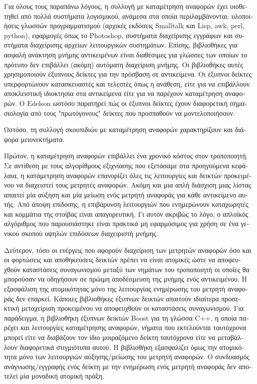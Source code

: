 \begin{greek}
Για όλους τους παραπάνω λόγους, η συλλογή με καταμέτρηση
αναφορών έχει υιοθετηθεί από πολλά συστήματα λογισμικού,
ανάμεσα στα οποία περιλαμβάνονται: υλοποιήσεις γλωσσών
προγραμματισμού (αρχικές εκδόσεις Smalltalk και Lisp, awk,
perl, python), εφαρμογές όπως το Photoshop, συστήματα
διαχείρισης εγγράφων και συστήματα διαχείρισης αρχείων
λειτουργικών συστημάτων. Επίσης, βιβλιοθήκες για ασφαλή
ανάκτηση μνήμης αντικειμένων είναι διαθέσιμες για γλώσσες
των οποίων το πρότυπο δεν επιβάλλει (ακόμη) αυτόματη
διαχείριση μνήμης. Οι βιβλιοθήκες αυτές χρησιμοποιούν
έξυπνους δείκτες για την πρόσβαση σε αντικείμενα. Οι
έξυπνοι δείκτες υπερφορτώνουν κατασκευαστές και τελεστές
όπως η ανάθεση, είτε για να επιβάλλουν αποκλειστική ιδιοκτησία
στα αντικείμενα είτε για να παρέχουν καταμέτρηση αναφορών.
Ο Edelson \cite{DBLP:conf/iwmm/Edelson92} ωστόσο παρατηρεί
πώς οι έξυπνοι δείκτες έχουν διαφορετική σημασιολογία από
τους "πρωτόγονους" δείκτες που προσπαθούν να μοντελοποιήσουν.

Ωστόσο, τη συλλογή σκουπιδιών με καταμέτρηση αναφορών
χαρακτηρίζουν και διάφορα μειονεκτήματα.

Πρώτον, η καταμέτρηση αναφορών επιβάλλει ένα χρονικό κόστος
στον τροποποιητή. Σε αντίθεση με τους αλγορίθμους εξιχνίασης
που εξετάσαμε στα προηγούμενα κεφάλαια, η κατάμετρηση αναφορών
επανορίζει όλες τις λειτουργίες  και
 δεικτών προκειμένου να διαχειστεί τους
μετρητές αναφορών. Ακόμη και μια απλή διάσχιση μιας λίστας
απαιτεί μία αύξηση και μία μείωση ενός μετρητή αναφοράς για
κάθε αντικείμενο αυτής. Από άποψη επίδοσης, η επιβάρυνση
λειτουργιών που ενημερώνουν καταχωρητές και κομμάτια της
στοίβας είναι απαγορευτική. Γι αυτόν ακριβώς το λόγο, ο
απλοϊκός αλγόριθμος που παρουσιάστηκε είναι πρακτικά μη
εφαρμόσιμος για χρήση σε ένα γενικού σκοπού υψηλών επιδόσεων
διαχειριστή μνήμης.

Δεύτερον, τόσο οι ενέργεις που αφορούν διαχείριση των μετρητών
αναφορών όσο και οι φορτώσεις και αποθηκεύσεις δεικτών πρέπει
να είναι ατομικές ώστε να αποφευχθούν καταστάσεις συναγωνισμού
μεταξύ των νημάτων του τροποποιητή οι οποίες θα μπορούσαν να
οδηγήσουν σε πρώιμη αποδέσμευση της μνήμης ενός αντικειμένου.
Η εξασφάλιση της ατομικότητας μόνο της λειτουργίας ενημέρωσης
του μετρητή αναφοράς δεν επαρκεί. Κάποιες βιβλιοθήκες έξυπνων
δεικτών απαιτούν ιδιαίτερα προσεκτική μεταχείριση προκειμένου
να αποφευχθούν οι καταστάσεις συναγωνισμού. Για παράδειγμα,
η βιβλιοθήκη έξυπνων δεικτών Boost για τη γλώσσα C++, η οποία
παρέχει και λειτουργίες καταμέτρησης αναφορών, νήματα που
εκτελούνται ταυτόχρονα μπορεί είτε να διαβάζουν τον ίδιο
μοιραζόμενο δείκτη ταυτόχρονα είτε να μεταβάλλουν διαφορετικά
στιγμιότυπα αυτού. Η βιβλιοθήκη εξασφαλίζει όμως την
ατομικότητα μόνο των λειτουργιών αύξησης/μείωσης του μετρητή
αναφορών. Ο συνδυασμός ανάγνωσης/εγγραφής ενός δείκτη με την
ενημέρωση ενός μετρητή αναφοράς δεν αποτελεί μία μοναδική
ατομική πράξη.


\end{greek}
